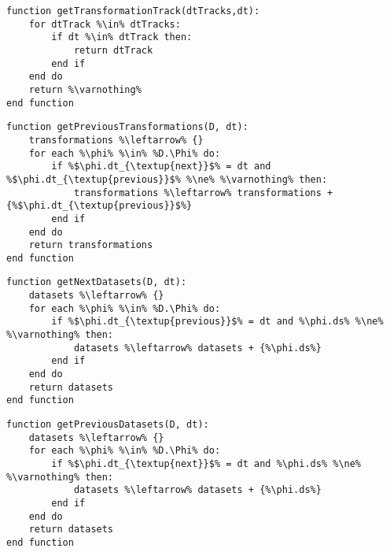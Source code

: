 \vfill{}

\begin{minipage}[c]{0.95\textwidth} \begin{lstlisting}[language=pseudocode,label={lst:get-transformation-track},caption={[Obtenção da trilha de transformações de uma transformação.]Obtenção da trilha de transformações de uma transformação.}]
function getTransformationTrack(dtTracks,dt):
    for dtTrack %\in% dtTracks:
        if dt %\in% dtTrack then:
            return dtTrack
        end if
    end do
    return %\varnothing%
end function
\end{lstlisting}
\end{minipage}

\vfill{}

\begin{minipage}[c]{0.95\textwidth}
\begin{lstlisting}[language=pseudocode,label={lst:get-previous-transformations},caption={[Obtenção das transformações de dados anteriores a uma transformação]Obtenção das transformações de dados anteriores a uma transformação de dados.}]
function getPreviousTransformations(D, dt):
    transformations %\leftarrow% {}
    for each %\phi% %\in% %D.\Phi% do:
        if %$\phi.dt_{\textup{next}}$% = dt and %$\phi.dt_{\textup{previous}}$% %\ne% %\varnothing% then:
            transformations %\leftarrow% transformations + {%$\phi.dt_{\textup{previous}}$%}
        end if
    end do
    return transformations
end function
\end{lstlisting}
\end{minipage}

\vfill{}

\begin{minipage}[c]{0.95\textwidth}
\begin{lstlisting}[language=pseudocode,label={lst:get-next-datasets},caption={[Obtenção dos próximos conjuntos de dados de uma transformação]Obtenção dos próximos conjuntos de dados de uma transformação de dados.}]
function getNextDatasets(D, dt):
    datasets %\leftarrow% {}
    for each %\phi% %\in% %D.\Phi% do:
        if %$\phi.dt_{\textup{previous}}$% = dt and %\phi.ds% %\ne% %\varnothing% then:
            datasets %\leftarrow% datasets + {%\phi.ds%}
        end if
    end do
    return datasets
end function
\end{lstlisting}
\end{minipage}

\vfill{}

\begin{minipage}[c]{0.95\textwidth}
\begin{lstlisting}[language=pseudocode,label={lst:get-previous-datasets},caption={[Obtenção dos conjuntos de dados anteriores a uma transformação]Obtenção dos conjuntos de dados anteriores a uma transformação de dados.}]
function getPreviousDatasets(D, dt):
    datasets %\leftarrow% {}
    for each %\phi% %\in% %D.\Phi% do:
        if %$\phi.dt_{\textup{next}}$% = dt and %\phi.ds% %\ne% %\varnothing% then:
            datasets %\leftarrow% datasets + {%\phi.ds%}
        end if
    end do
    return datasets
end function
\end{lstlisting}
\end{minipage}

